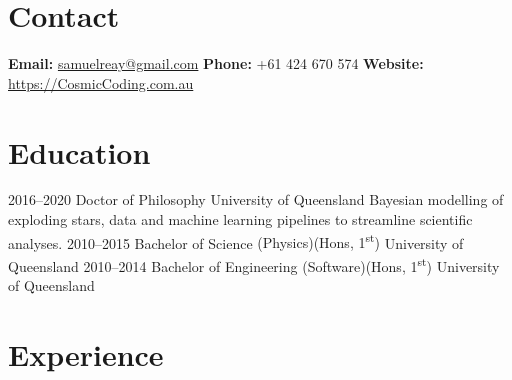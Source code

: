 \documentclass[11pt]{friggeri-cv}
\begin{document}
\pagestyle{plain}


\section{Contact}

\textbf{Email: } \href{samuelreay@gmail.com}{samuelreay@gmail.com}   \hspace{1mm}
\textbf{Phone: } +61 424 670 574      \hspace{1mm}
\textbf{Website: } \href{https://cosmiccoding.com.au}{https://CosmicCoding.com.au}   



\section{Education}

\begin{entrylist}
\entry
{2016--2020}
{Doctor of Philosophy}
{University of Queensland}
{Bayesian modelling of exploding stars, data and machine learning pipelines to streamline scientific analyses.}
\entrysmall
{2010--2015}
{Bachelor of Science {\normalfont (Physics)(Hons, 1\textsuperscript{st})}}
{University of Queensland}
{}%
\entrysmall
{2010--2014}
{Bachelor of Engineering {\normalfont (Software)(Hons, 1\textsuperscript{st})}}
{University of Queensland}
{}%
\end{entrylist}



\section{Experience}
\end{document}

